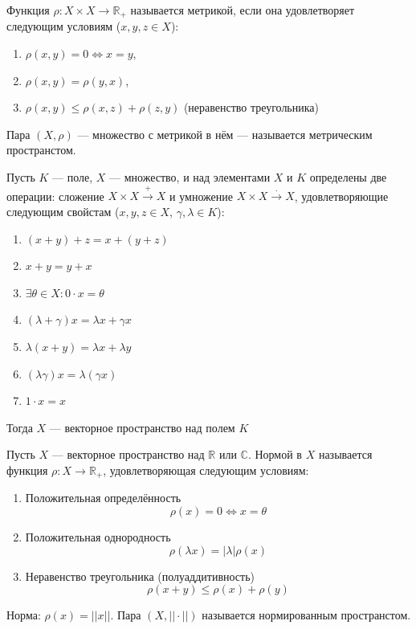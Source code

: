 \documentclass[12pt,a4paper]{article}
\begin{document}
Функция $\rho: X \times X \rightarrow \mathbb{R}_{+}$ называется метрикой, если она удовлетворяет следующим условиям ($x, y, z \in X$):
\begin{enumerate}
\item $\rho(x, y) = 0 \Leftrightarrow x = y$,
\item $\rho(x, y) = \rho(y, x)$,
\item $\rho(x, y) \leq \rho(x, z) + \rho(z, y)$ (неравенство треугольника)
\end{enumerate}

Пара $(X, \rho)$ --- множество с метрикой в нём --- называется метрическим пространстом.

Пусть $K$ --- поле, $X$ --- множество, и над элементами $X$ и $K$ определены две операции: сложение $X \times X \xrightarrow{+} X$ и умножение $X \times X \xrightarrow{\cdot} X$, удовлетворяющие следующим свойстам ($x, y, z \in X$, $\gamma, \lambda \in K$):
\begin{enumerate}
\item $(x+y)+z=x+(y+z)$
\item $x+y=y+x$
\item $\exists \theta \in X: 0\cdot x = \theta$
\item $(\lambda+\gamma)x=\lambda x + \gamma x$
\item $\lambda (x+y) = \lambda x + \lambda y$
\item $(\lambda \gamma) x = \lambda (\gamma x)$
\item $1 \cdot x = x$
\end{enumerate}

Тогда $X$ --- векторное пространство над полем $K$

Пусть $X$ --- векторное пространство над $\mathbb{R}$ или $\mathbb{C}$. Нормой в $X$ называется функция $\rho: X \rightarrow \mathbb{R}_{+}$, удовлетворяющая следующим условиям:
\begin{enumerate}
\item Положительная определённость
$$
\rho(x) = 0 \Leftrightarrow x = \theta
$$

\item Положительная однородность
$$
\rho(\lambda x) = |\lambda| \rho(x)
$$

\item Неравенство треугольника (полуаддитивность)
$$
\rho(x+y) \leq \rho(x) + \rho(y)
$$
\end{enumerate}

Норма: $\rho(x)=||x||$. Пара $(X, ||\cdot||)$ называется нормированным пространстом.
\end{document}
